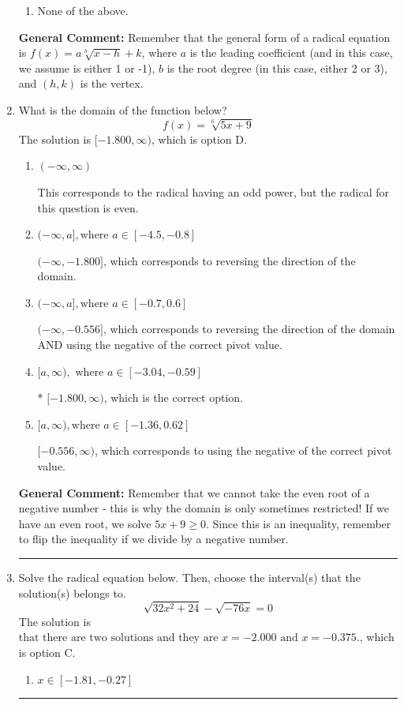 \documentclass{extbook}[14pt]
\newcommand{\litem}[1]{\item #1

\rule{\textwidth}{0.4pt}}
\begin{document}
\begin{enumerate}
{\begin{enumerate}[label=\Alph*.]
\begin{multicols}{2}
\end{multicols}\item None of the above.\end{enumerate}
\textbf{General Comment:} Remember that the general form of a radical equation is $ f(x) = a \sqrt[b]{x - h} + k $, where $a$ is the leading coefficient (and in this case, we assume is either 1 or -1), $b$ is the root degree (in this case, either 2 or 3), and $(h, k)$ is the vertex.
}
\litem{
What is the domain of the function below?
\[ f(x) = \sqrt[6]{5 x + 9} \]The solution is \( [-1.800, \infty) \), which is option D.\begin{enumerate}[label=\Alph*.]
\item \( (-\infty, \infty) \)

This corresponds to the radical having an odd power, but the radical for this question is even.
\item \( (-\infty, a], \text{where } a \in [-4.5, -0.8] \)

 $(-\infty, -1.800]$, which corresponds to reversing the direction of the domain.
\item \( (-\infty, a], \text{where } a \in [-0.7, 0.6] \)

$(-\infty, -0.556]$, which corresponds to reversing the direction of the domain AND using the negative of the correct pivot value.
\item \( [a, \infty), \text{ where } a \in [-3.04, -0.59] \)

* $[-1.800, \infty)$, which is the correct option.
\item \( [a, \infty), \text{where } a \in [-1.36, 0.62] \)

$[-0.556, \infty)$, which corresponds to using the negative of the correct pivot value.
\end{enumerate}

\textbf{General Comment:} Remember that we cannot take the even root of a negative number - this is why the domain is only sometimes restricted! If we have an even root, we solve $5 x + 9 \geq 0$. Since this is an inequality, remember to flip the inequality if we divide by a negative number.
}
\litem{
Solve the radical equation below. Then, choose the interval(s) that the solution(s) belongs to.
\[ \sqrt{32 x^2 + 24} - \sqrt{-76 x} = 0 \]The solution is \( \text{that there are two solutions and they are } x = -2.000 \text{ and } x = -0.375. \), which is option C.\begin{enumerate}[label=\Alph*.]
\item \( x \in [-1.81,-0.27] \)


\end{enumerate}}
\end{enumerate}
\end{document}
